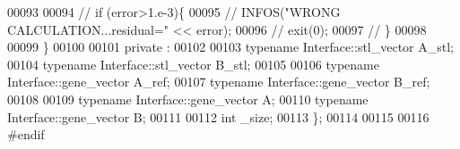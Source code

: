\begin{DoxyCode}
00093 
00094 \textcolor{comment}{//     if (error>1.e-3)\{}
00095 \textcolor{comment}{//       INFOS("WRONG CALCULATION...residual=" << error);}
00096 \textcolor{comment}{//       exit(0);}
00097 \textcolor{comment}{//     \}}
00098 
00099   \}
00100 
00101 private :
00102 
00103   \textcolor{keyword}{typename} Interface::stl\_vector A\_stl;
00104   \textcolor{keyword}{typename} Interface::stl\_vector B\_stl;
00105 
00106   \textcolor{keyword}{typename} Interface::gene\_vector A\_ref;
00107   \textcolor{keyword}{typename} Interface::gene\_vector B\_ref;
00108 
00109   \textcolor{keyword}{typename} Interface::gene\_vector A;
00110   \textcolor{keyword}{typename} Interface::gene\_vector B;
00111 
00112   \textcolor{keywordtype}{int} \_size;
00113 \};
00114 
00115 
00116 \textcolor{preprocessor}{#endif}
\end{DoxyCode}
